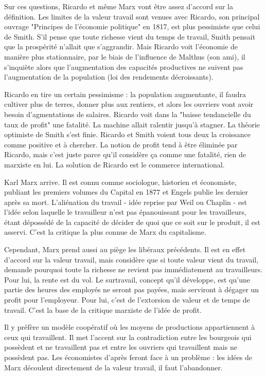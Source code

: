 \documentclass[a4paper,12pt]{book}
\begin{document}
\par Sur ces questions, Ricardo et même Marx vont être assez d'accord sur la définition. Les limites de la valeur travail sont venues avec Ricardo, son principal ouvrage "Principes de l'économie politique" en 1817, est plus pessimiste que celui de Smith. S'il pense que toute richesse vient du temps de travail, Smith pensait que la prospérité n'allait que s'aggrandir. Mais Ricardo voit l'économie de manière plus stationnaire, par le biais de l'influence de Malthus (son ami), il s'inquiète alors que l'augmentation des capacités productives ne suivent pas l'augmentation de la population (loi des rendements décroissants).
\par Ricardo en tire un certain pessimisme : la population augmentante, il faudra cultiver plus de terres, donner plus aux rentiers, et alors les ouvriers vont avoir besoin d'agmentations de salaires. Ricardo voit dans la "baisse tendancielle du taux de profit" une fatalité. La machine allait ralentir jusqu'à stagner. La théorie optimiste de Smith s'est finie. Ricardo et Smith voient tous deux la croissance comme positive et à chercher. La notion de profit tend à être éliminée par Ricardo, mais c'est juste parce qu'il considère ça comme une fatalité, rien de marxiste en lui. La solution de Ricardo est le commerce international.
\par Karl Marx arrive. Il est connu comme sociologue, historien et économiste, publiant les premiers volumes du Capital en 1877 et Engels publie les dernier après sa mort. L'aliénation du travail - idée reprise par Weil ou Chaplin - est l'idée selon laquelle le travailleur n'est pas épanouissant pour les travailleurs, étant dépossédé de la capacité de décider de quoi que ce soit sur le produit, il est asservi. C'est la critique la plus connue de Marx du capitalisme.
\par Cependant, Marx prend aussi au piège les libéraux précédents. Il est en effet d'accord sur la valeur travail, mais considère que si toute valeur vient du travail, demande pourquoi toute la richesse ne revient pas immédiatement au travailleurs. Pour lui, la rente est du vol. Le surtravail, concept qu'il développe, est qu'une partie des heures des employés ne seront pas payées, mais serviront à dégager un profit pour l'employeur. Pour lui, c'est de l'extorsion de valeur et de temps de travail. C'est la base de la critique marxiste de l'idée de profit.
\par Il y préfère un modèle coopératif où les moyens de productions appartiennent à ceux qui travaillent. Il met l'accent sur la contradiction entre les bourgeois qui possèdent et ne travaillent pas et entre les ouvriers qui travaillent mais ne possèdent pas. Les économistes d'après feront face à un problème : les idées de Marx découlent directement de la valeur travail, il faut l'abandonner.
\end{document}
